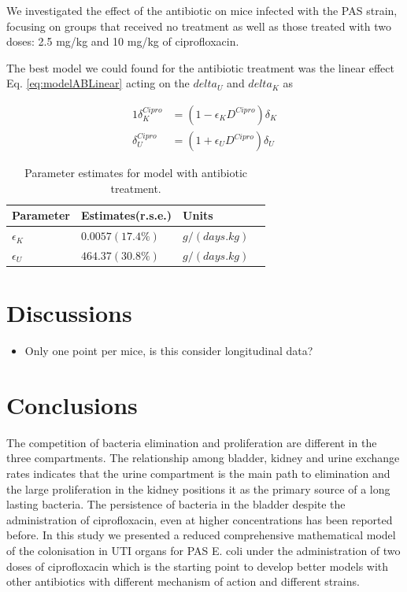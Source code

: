\documentclass{article}
\begin{document}
We investigated the effect of the antibiotic on mice infected with the PAS strain, focusing on groups that received no treatment as well as those treated with two doses: 2.5 mg/kg and 10 mg/kg of ciprofloxacin.

The best model we could found for the antibiotic treatment was the linear effect Eq. \ref{eq:modelABLinear} acting on the $delta_{U}$ and $delta_{K}$ as 

\begin{alignat}{1}
\delta_{K}^{Cipro} &= \left(1 - \epsilon_K D^{Cipro} \right) \delta_{K} \nonumber \\
\delta_{U}^{Cipro} &= \left(1 + \epsilon_U D^{Cipro} \right) \delta_{U}
\end{alignat}




\begin{table}
	\begin{tabular}{|l|l|l|l|}
		\hline
		Parameter & Estimates(r.s.e.) & Units\\ \hline
		$\epsilon_{K}$ & $0.0057(17.4\%)$ & $g/(days.kg)$\\
		$\epsilon_{U}$ & $464.37(30.8\%)$ & $g/(days.kg)$\\
		\hline
	\end{tabular}
	\caption{Parameter estimates for model with antibiotic treatment.}
\end{table}




\section{Discussions}
\begin{itemize}
	\item Only one point per mice, is this consider longitudinal data?
\end{itemize}

\section{Conclusions}

The competition of bacteria elimination and proliferation are different in the three compartments.
The relationship among bladder, kidney and urine exchange rates indicates that the urine compartment is the main path to elimination and the large proliferation in the kidney positions it as the primary source of a long lasting bacteria. The persistence of bacteria in the bladder despite the administration of ciprofloxacin, even at higher concentrations has been reported before.\cite{jakobsen2020ciprofloxacin} In this study we presented a reduced comprehensive mathematical model of the colonisation in UTI organs for PAS E. coli under the administration of two doses of ciprofloxacin which is the starting point to develop better models with other antibiotics with different mechanism of action and different strains.
\end{document}
